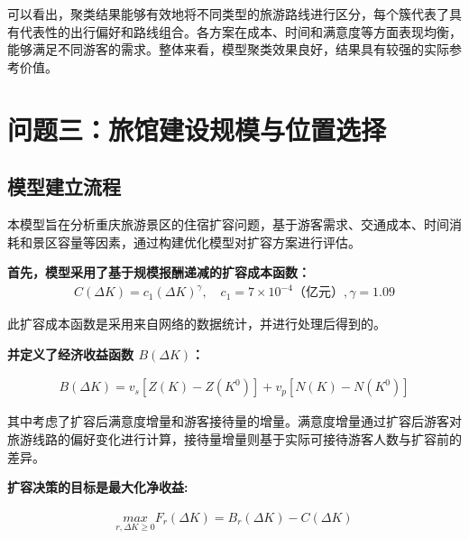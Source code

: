 可以看出，聚类结果能够有效地将不同类型的旅游路线进行区分，每个簇代表了具有代表性的出行偏好和路线组合。各方案在成本、时间和满意度等方面表现均衡，能够满足不同游客的需求。整体来看，模型聚类效果良好，结果具有较强的实际参考价值。






\section[\hspace{-2pt}问题三：旅馆建设规模与位置选择]{{\heiti{} \hspace{-8pt}问题三：旅馆建设规模与位置选择}}\label{section4: 问题3：旅馆建设规模与位置选择}

\subsection[\hspace{-2pt}模型建立流程]{{\heiti{}\hspace{-8pt}模型建立流程}}\label{subsec:3-model-build}


本模型旨在分析重庆旅游景区的住宿扩容问题，基于游客需求、交通成本、时间消耗和景区容量等因素，通过构建优化模型对扩容方案进行评估。

\noindent\textbf{首先，模型采用了基于规模报酬递减的扩容成本函数：}
\begin{equation}
  \begin{aligned}
    C(\Delta K)=c_{1}(\Delta K)^{\gamma}, \quad c_{1} =7\times 10^{-4}\text{（亿元）}, \gamma = 1.09
  \end{aligned}
\end{equation}

此扩容成本函数是采用来自网络的数据统计，并进行处理后得到的。

\noindent\textbf{并定义了经济收益函数 $B(\Delta K)$：}

\begin{equation}
  \begin{aligned}
    B(\Delta K) = v_{s}[Z(K)-Z(K^0)]+v_{p}[N(K)-N(K^{0})]
  \end{aligned}
\end{equation}

其中考虑了扩容后满意度增量和游客接待量的增量。满意度增量通过扩容后游客对旅游线路的偏好变化进行计算，接待量增量则基于实际可接待游客人数与扩容前的差异。

\noindent\textbf{扩容决策的目标是最大化净收益:}

\begin{equation}
  \begin{aligned}
    \underset{r,\Delta K\geq 0}{max}  F_r(\Delta K) = B_r(\Delta K) - C(\Delta K)
  \end{aligned}
\end{equation}

